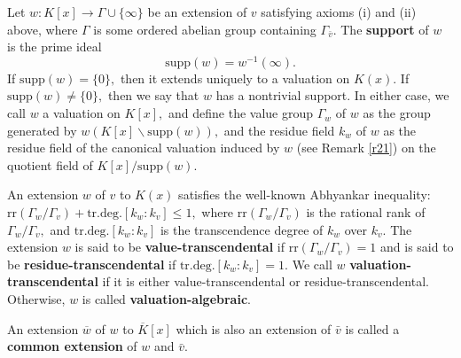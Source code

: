\documentclass[11pt]{amsart}
\theoremstyle{definition}
\theoremstyle{remark}
\numberwithin{equation}{section}
\begin{document}
 Let $w:K[x]\longrightarrow\Gamma\cup\{\infty\}$ be an extension of $v$ satisfying axioms (i) and (ii) above, where $\Gamma$ is some ordered abelian group containing $\Gamma_{\bar{v}}.$ The {\bf support}  of $w$ is the prime ideal
 \[\text{supp}(w)=w^{-1}(\infty).\] If $\text{supp}(w)=\{0\},$ then it extends uniquely to a valuation on $K(x).$ If $\text{supp}(w)\neq\{0\},$ then we say that $w$ has a nontrivial support. In either case, we call $w$ a valuation on $K[x],$ and define the value group $\Gamma_w$ of $w$ as the group generated by $w(K[x]\backslash\text{supp}(w)),$ and the residue field $k_w$ of $w$ as the residue field of the canonical valuation induced by $w$ (see Remark \ref{r21}) on the quotient field of $K[x]/\text{supp}(w)$.

 An extension $w$ of $v$ to $K(x)$ satisfies the well-known Abhyankar inequality: $\text{rr}(\Gamma_w / \Gamma_v) + \text{tr.deg.}[k_{w}: k_v] \leq 1,$ where $\text{rr}(\Gamma_w / \Gamma_v )$ is the rational rank of $\Gamma_ w / \Gamma_ v,$ and $\text{tr.deg.}[k_{w}: k_v]$ is the transcendence degree of $k_{w}$ over $k_v.$ The extension $w$ is said to be {\bf value-transcendental} if $\text{rr}(\Gamma_w / \Gamma_v)=1$ and is said to be {\bf residue-transcendental} if $\text{tr.deg.}[k_{w}: k_v]=1$. We call $w$ {\bf valuation-transcendental} if it is either value-transcendental or residue-transcendental. Otherwise, $w$ is called {\bf valuation-algebraic}.

An extension $\overline{w}$ of $w$ to $\overline{K}[x]$ which is also an extension of $\bar{v}$ is called a {\bf common extension} of $w$ and $\bar{v}$. 
\end{document}
